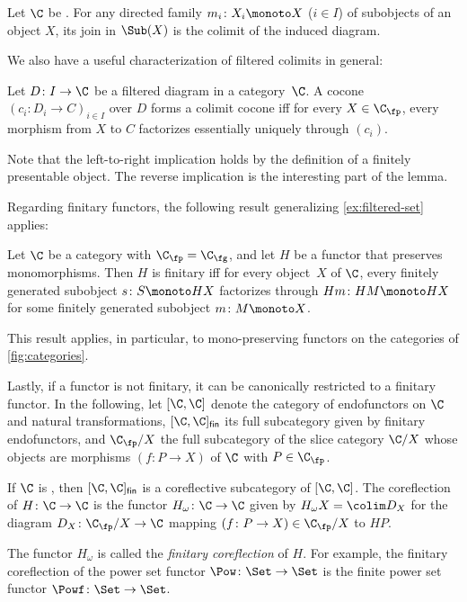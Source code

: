 \documentclass[a4paper,UKenglish, autoref, numberwithinsect, final]{lipics-v2021}
\numberwithin{equation}{section}
\newcommand{\resetCurThmBraces}{%
  \gdef\curThmBraceOpen{(}%
  \gdef\curThmBraceClose{)}}
\newcommand{\removeThmBraces}{%
  \gdef\curThmBraceOpen{}%
  \gdef\curThmBraceClose{}}
\newenvironment{notheorembrackets}{\removeThmBraces}{\resetCurThmBraces}
\theoremstyle{plain}
\theoremstyle{definition}
\begin{document}
\begin{lemma}\label{lem:lfp-directed-unions}
Let $\C$ be \lfp. For any directed family $m_i\colon X_i\monoto X$ ($i\in I$) of subobjects of an object $X$, its join in $\Sub(X)$ is the colimit of the induced diagram.
\end{lemma}

We also have a useful characterization of filtered colimits in general:

\begin{lemma}\label{lem:filtered-colimits}
Let $D\colon I\to \C$ be a filtered diagram in a \lfp category~$\C$. A cocone $(c_i\colon D_i\to C)_{i\in I}$ over $D$ forms a colimit cocone iff for every $X\in \C_\fp$, every morphism from $X$ to $C$ factorizes essentially uniquely through $(c_i)$.
\end{lemma}
Note that the left-to-right implication holds by the definition of a finitely presentable object. The reverse implication is the interesting part of the lemma. 

Regarding finitary functors, the following result generalizing \autoref{ex:filtered-set} applies:

\begin{notheorembrackets}
\begin{lemma}\label{lem:finitary-criterion}
Let $\C$ be a \lfp category with $\C_\fp = \C_\fg$, and let $H$ be a functor that preserves monomorphisms. Then $H$ is finitary iff for every object~$X$ of $\C$, every finitely generated subobject $s\colon S\monoto HX$ factorizes through $Hm\colon HM\monoto HX$ for some finitely generated subobject $m\colon M\monoto X$.  
\end{lemma}
\end{notheorembrackets}
This result applies, in particular, to mono-preserving functors on the categories of \autoref{fig:categories}.

Lastly, if a functor is not finitary, it can be canonically restricted to a finitary functor. In the following, let $[\C,\C]$ denote the category of endofunctors on $\C$ and natural transformations, $[\C,\C]_{\mathsf{fin}}$ its full subcategory given by finitary endofunctors, and $\C_\fp/X$ the full subcategory of the slice category $\C/X$ whose objects are morphisms $(f\colon P\to X)$ of $\C$ with $P\in \C_\fp$.

\begin{notheorembrackets}
\begin{lemma}\label{lem:finitary-coreflection}
If $\C$ is \lfp, then $[\C,\C]_{\mathsf{fin}}$ is a coreflective subcategory of $[\C,\C]$. The coreflection of $H\colon \C\to \C$ is the functor $H_\omega\colon \C\to\C$ given by $H_\omega X=\colim D_X$ for the diagram $D_X\colon \C_\fp/X\to \C$ mapping $(f\colon P\to X)\in \C_\fp/X$ to $HP$.   
\end{lemma}
\end{notheorembrackets}
The functor $H_\omega$ is called the \emph{finitary coreflection} of $H$. For example, the finitary coreflection of the power set functor $\Pow\colon \Set\to \Set$ is the finite power set functor $\Powf\colon \Set\to \Set$.
\end{document}
